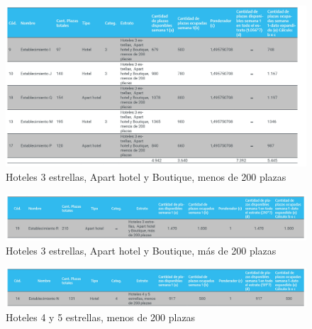 \documentclass[
]{book}
\begin{document}
\begin{figure}

{\centering \includegraphics[width=1\linewidth]{imagenes/hoteles3_estrellas_apart_boutique_menos_200_plazas} 

}

\caption{Hoteles 3 estrellas,  Apart hotel y Boutique, menos de 200 plazas}\label{fig:3-estrellas}
\end{figure}

\begin{figure}

{\centering \includegraphics[width=1\linewidth]{imagenes/hoteles3_estrellas_apart_boutique_mas_200_plazas} 

}

\caption{Hoteles 3 estrellas,  Apart hotel y Boutique, más de 200 plazas}\label{fig:3-estrellas-mas200}
\end{figure}

\begin{figure}

{\centering \includegraphics[width=1\linewidth]{imagenes/hoteles4_5_estrellas_menos_200_plazas} 

}

\caption{Hoteles 4 y 5 estrellas, menos de 200 plazas}\label{fig:4-5-estrellas-menos200}
\end{figure}
\end{document}
